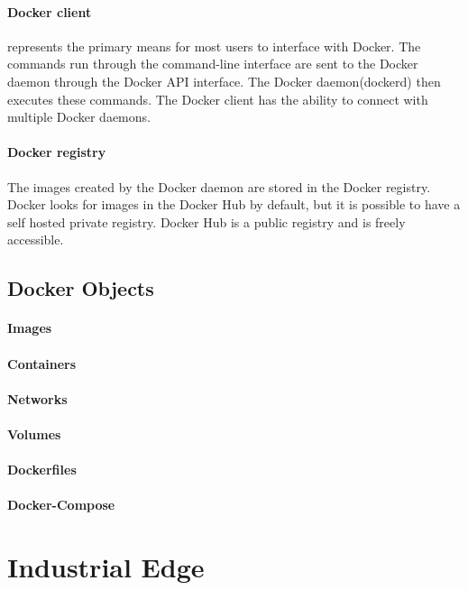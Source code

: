 		\paragraph{Docker client} represents the primary means for most users to interface with Docker. The commands run through the command-line interface are sent to the Docker daemon through the Docker API interface. The Docker daemon(dockerd) then executes these commands. The Docker client has the ability to connect with multiple Docker daemons.\cite[P.~32]{Kinnary2018}
		
		\paragraph{Docker registry} The images created by the Docker daemon are stored in the Docker registry. Docker looks for images in the Docker Hub by default, but it is possible to have a self hosted private registry. Docker Hub is a public registry and is freely accessible.\cite[P.~33]{Kinnary2018}
			
		\subsection{Docker Objects}
		\label{Grundlagen:Docker:Docker Objects}
		\paragraph{Images}
		\paragraph{Containers}
		\paragraph{Networks}
		\paragraph{Volumes}
			
			
		\paragraph{Dockerfiles}
			
		
		\paragraph{Docker-Compose}
			
				
	\section{Industrial Edge}
	\label{Grundlagen:IndustrialEdge}
		
